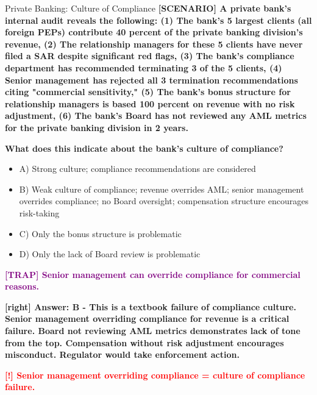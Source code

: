 \documentclass[11pt,a4paper]{beamer}
\newcommand{\redflag}[1]{\textcolor{red}{\textbf{[!] #1}}}
\newcommand{\trap}[1]{\textcolor{purple}{\textbf{[TRAP] #1}}}
\newcommand{\correct}[1]{\textcolor{green!50!black}{\textbf{[right] #1}}}
\newcommand{\scenario}[1]{\textcolor{blue!70!black}{\textbf{[SCENARIO] #1}}}
\begin{document}
	
	\begin{frame}{Private Banking: Culture of Compliance}
		\tiny
		\scenario{A private bank's internal audit reveals the following: (1) The bank's 5 largest clients (all foreign PEPs) contribute 40 percent of the private banking division's revenue, (2) The relationship managers for these 5 clients have never filed a SAR despite significant red flags, (3) The bank's compliance department has recommended terminating 3 of the 5 clients, (4) Senior management has rejected all 3 termination recommendations citing "commercial sensitivity," (5) The bank's bonus structure for relationship managers is based 100 percent on revenue with no risk adjustment, (6) The bank's Board has not reviewed any AML metrics for the private banking division in 2 years.}
		
		\vspace{0.02cm}
		\textbf{What does this indicate about the bank's culture of compliance?}
		\vspace{0.02cm}
		
		\begin{itemize}
			\item A) Strong culture; compliance recommendations are considered
			\item B) Weak culture of compliance; revenue overrides AML; senior management overrides compliance; no Board oversight; compensation structure encourages risk-taking
			\item C) Only the bonus structure is problematic
			\item D) Only the lack of Board review is problematic
		\end{itemize}
		
		\vspace{0.02cm}
		\trap{Senior management can override compliance for commercial reasons.}
		
		\vspace{0.02cm}
		\correct{Answer: B - This is a textbook failure of compliance culture. Senior management overriding compliance for revenue is a critical failure. Board not reviewing AML metrics demonstrates lack of tone from the top. Compensation without risk adjustment encourages misconduct. Regulator would take enforcement action.}
		
		\vspace{0.02cm}
		\redflag{Senior management overriding compliance = culture of compliance failure.}
	\end{frame}
	
\end{document}
